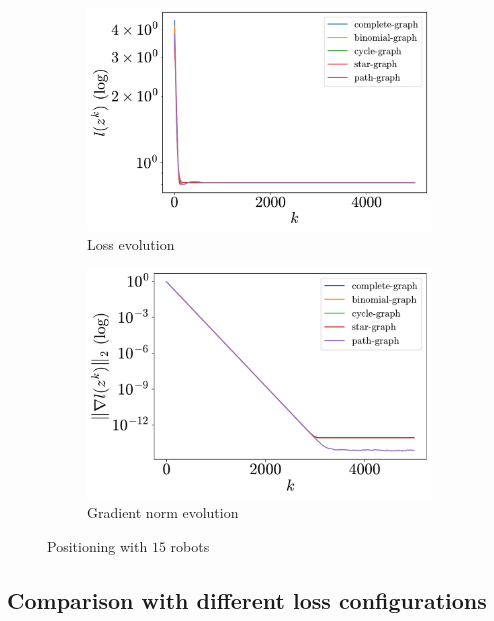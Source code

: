 \documentclass[a4paper,11pt,oneside]{book}
\begin{document}
\begin{figure}[H]
      \centering
      \begin{subfigure}[t]{0.46\linewidth}
            \centering
            \includegraphics[width=\linewidth]{./figs/aggregative/more_agents/loss.pdf} 
            \caption{Loss evolution}
      \end{subfigure}
      \hfill
      \begin{subfigure}[t]{0.46\linewidth}
            \centering
            \includegraphics[width=\linewidth]{./figs/aggregative/more_agents/gradient.pdf} 
            \caption{Gradient norm evolution}
      \end{subfigure}
      \caption{Positioning with $15$ robots}
      \label{fig:positioning_15}
\end{figure}



\subsection{Comparison with different loss configurations}
\end{document}
